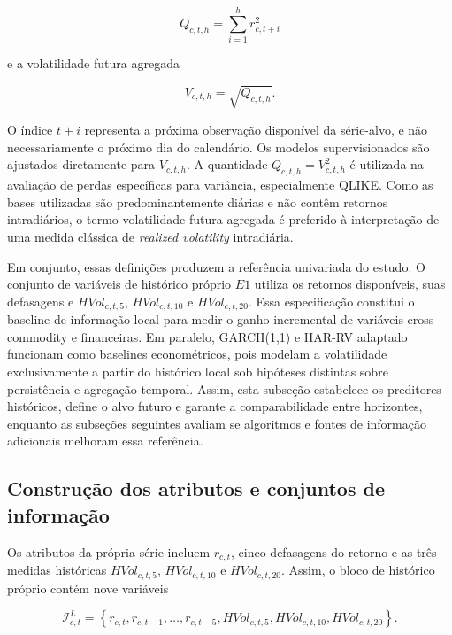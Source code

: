 \documentclass[a4paper,fleqn]{cas-sc}
\begin{document}
\begin{equation}
Q_{c,t,h}=\sum_{i=1}^{h}r_{c,t+i}^{2}
\label{eq:forward_variance}
\end{equation}

e a volatilidade futura agregada

\begin{equation}
V_{c,t,h}=\sqrt{Q_{c,t,h}}.
\label{eq:forward_vol}
\end{equation}

O índice \(t+i\) representa a próxima observação disponível da série-alvo, e não necessariamente o próximo dia do calendário. Os modelos supervisionados são ajustados diretamente para \(V_{c,t,h}\). A quantidade \(Q_{c,t,h}=V_{c,t,h}^{2}\) é utilizada na avaliação de perdas específicas para variância, especialmente QLIKE. Como as bases utilizadas são predominantemente diárias e não contêm retornos intradiários, o termo volatilidade futura agregada é preferido à interpretação de uma medida clássica de \textit{realized volatility} intradiária.

Em conjunto, essas definições produzem a referência univariada do estudo. O conjunto de variáveis de histórico próprio \(E1\) utiliza os retornos disponíveis, suas defasagens e \(HVol_{c,t,5}\), \(HVol_{c,t,10}\) e \(HVol_{c,t,20}\). Essa especificação constitui o baseline de informação local para medir o ganho incremental de variáveis cross-commodity e financeiras. Em paralelo, GARCH(1,1) e HAR-RV adaptado funcionam como baselines econométricos, pois modelam a volatilidade exclusivamente a partir do histórico local sob hipóteses distintas sobre persistência e agregação temporal. Assim, esta subseção estabelece os preditores históricos, define o alvo futuro e garante a comparabilidade entre horizontes, enquanto as subseções seguintes avaliam se algoritmos e fontes de informação adicionais melhoram essa referência.

\subsection{Construção dos atributos e conjuntos de informação}
\label{subsec:features}

Os atributos da própria série incluem \(r_{c,t}\), cinco defasagens do retorno e as três medidas históricas \(HVol_{c,t,5}\), \(HVol_{c,t,10}\) e \(HVol_{c,t,20}\). Assim, o bloco de histórico próprio contém nove variáveis

\begin{equation}
\mathcal{I}^{L}_{c,t}
=
\left\{
r_{c,t},r_{c,t-1},\ldots,r_{c,t-5},
HVol_{c,t,5},HVol_{c,t,10},HVol_{c,t,20}
\right\}.
\label{eq:local_info}
\end{equation}
\end{document}
